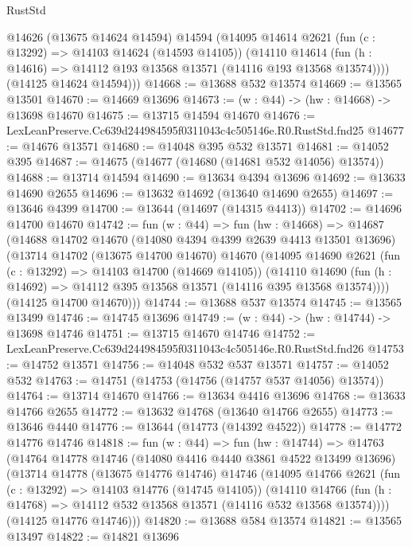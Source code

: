 \begin{lexlean}{RustStd}
\begin{coremodule}
        @14626
        (@13675 @14624 @14594)
        @14594
        (@14095
          @14614
          @2621
          (fun (c : @13292) => @14103 @14624 (@14593 @14105))
          (@14110
            @14614
            (fun (h : @14616) => @14112 @193 @13568 @13571 (@14116 @193 @13568 @13574))))
        (@14125 @14624 @14594)))
@14668 := @13688 @532 @13574
@14669 := @13565 @13501
@14670 := @14669 @13696
@14673 := (w : @44) -> (hw : @14668) -> @13698 @14670
@14675 := @13715 @14594 @14670
@14676 := LexLeanPreserve.Cc639d244984595f0311043c4c505146e.R0.RustStd.fnd25
@14677 := @14676 @13571
@14680 := @14048 @395 @532 @13571
@14681 := @14052 @395
@14687 := @14675 (@14677 (@14680 (@14681 @532 @14056) @13574))
@14688 := @13714 @14594
@14690 := @13634 @4394 @13696
@14692 := @13633 @14690 @2655
@14696 := @13632 @14692 (@13640 @14690 @2655)
@14697 := @13646 @4399
@14700 := @13644 (@14697 (@14315 @4413))
@14702 := @14696 @14700 @14670
@14742 := fun (w : @44) =>
  fun (hw : @14668) =>
  @14687
    (@14688
      @14702
      @14670
      (@14080 @4394 @4399 @2639 @4413 @13501 @13696)
      (@13714
        @14702
        (@13675 @14700 @14670)
        @14670
        (@14095
          @14690
          @2621
          (fun (c : @13292) => @14103 @14700 (@14669 @14105))
          (@14110
            @14690
            (fun (h : @14692) => @14112 @395 @13568 @13571 (@14116 @395 @13568 @13574))))
        (@14125 @14700 @14670)))
@14744 := @13688 @537 @13574
@14745 := @13565 @13499
@14746 := @14745 @13696
@14749 := (w : @44) -> (hw : @14744) -> @13698 @14746
@14751 := @13715 @14670 @14746
@14752 := LexLeanPreserve.Cc639d244984595f0311043c4c505146e.R0.RustStd.fnd26
@14753 := @14752 @13571
@14756 := @14048 @532 @537 @13571
@14757 := @14052 @532
@14763 := @14751 (@14753 (@14756 (@14757 @537 @14056) @13574))
@14764 := @13714 @14670
@14766 := @13634 @4416 @13696
@14768 := @13633 @14766 @2655
@14772 := @13632 @14768 (@13640 @14766 @2655)
@14773 := @13646 @4440
@14776 := @13644 (@14773 (@14392 @4522))
@14778 := @14772 @14776 @14746
@14818 := fun (w : @44) =>
  fun (hw : @14744) =>
  @14763
    (@14764
      @14778
      @14746
      (@14080 @4416 @4440 @3861 @4522 @13499 @13696)
      (@13714
        @14778
        (@13675 @14776 @14746)
        @14746
        (@14095
          @14766
          @2621
          (fun (c : @13292) => @14103 @14776 (@14745 @14105))
          (@14110
            @14766
            (fun (h : @14768) => @14112 @532 @13568 @13571 (@14116 @532 @13568 @13574))))
        (@14125 @14776 @14746)))
@14820 := @13688 @584 @13574
@14821 := @13565 @13497
@14822 := @14821 @13696

\end{coremodule}
\end{lexlean}
